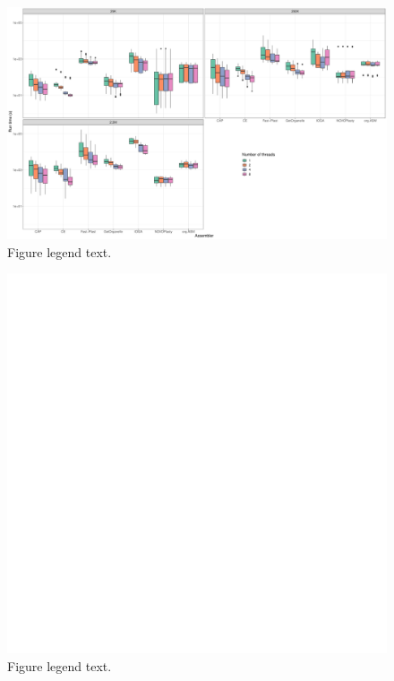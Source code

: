 \documentclass{bmcart}
\begin{document}
\begin{backmatter}
\begin{figure}[h!]
  \includegraphics[width=\textwidth]{plots/comp_time_log.pdf}
  \caption{
      Figure legend text.}
      \end{figure}

\begin{figure}[h!]
  \includegraphics[width=\textwidth,page=2]{plots/upset.pdf}
  \caption{
      Figure legend text.}
      \end{figure}


\end{backmatter}
\end{document}
